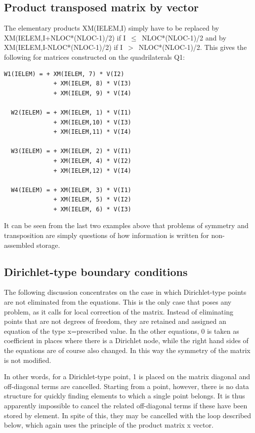 \subsection{Product transposed matrix by vector}

The elementary products XM(IELEM,I) simply have to be replaced by
XM(IELEM,I+NLOC*(NLOC-1)/2) if I~$\mathrm{\le}$~NLOC*(NLOC-1)/2 and by
XM(IELEM,I-NLOC*(NLOC-1)/2) if I~$>$~NLOC*(NLOC-1)/2. This gives the following
for matrices constructed on the quadrilaterals Q1:

\begin{lstlisting}[language=TelFortran]
  W1(IELEM) = + XM(IELEM, 7) * V(I2)
              + XM(IELEM, 8) * V(I3)
              + XM(IELEM, 9) * V(I4)

  W2(IELEM) = + XM(IELEM, 1) * V(I1)
              + XM(IELEM,10) * V(I3)
              + XM(IELEM,11) * V(I4)

  W3(IELEM) = + XM(IELEM, 2) * V(I1)
              + XM(IELEM, 4) * V(I2)
              + XM(IELEM,12) * V(I4)

  W4(IELEM) = + XM(IELEM, 3) * V(I1)
              + XM(IELEM, 5) * V(I2)
              + XM(IELEM, 6) * V(I3)
\end{lstlisting}

It can be seen from the last two examples above that problems of symmetry and
transposition are simply questions of how information is written for
non-assembled storage.

\subsection{Dirichlet-type boundary conditions}

The following discussion concentrates on the case in which Dirichlet-type
points are not eliminated from the equations. This is the only case that poses
any problem, as it calls for local correction of the matrix. Instead of
eliminating points that are not degrees of freedom, they are retained and
assigned an equation of the type x=prescribed value. In the other equations, 0
is taken as coefficient in places where there is a Dirichlet node, while the
right hand sides of the equations are of course also changed. In this way the
symmetry of the matrix is not modified.

In other words, for a Dirichlet-type point, 1 is placed on the matrix diagonal
and off-diagonal terms are cancelled. Starting from a point, however, there is
no data structure for quickly finding elements to which a single point belongs.
It is thus apparently impossible to cancel the related off-diagonal terms if
these have been stored by element. In spite of this, they may be cancelled with
the loop described below, which again uses the principle of the product matrix
x vector.


